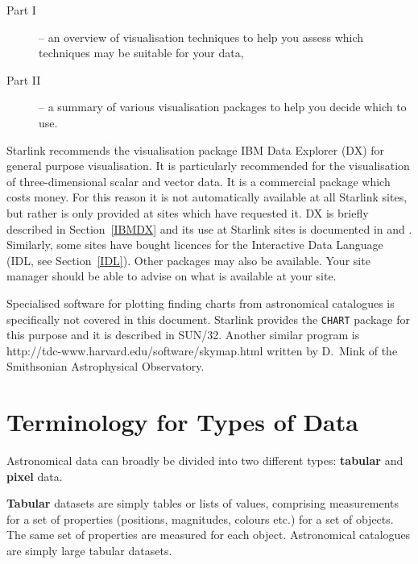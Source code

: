 \begin{description}

  \item[{\rm Part I}] -- an overview of visualisation techniques to
    help you assess which techniques may be suitable for your data,

  \item[{\rm Part II}] -- a summary of various visualisation packages
   to help you decide which to use.

\end{description}

Starlink recommends the visualisation package IBM Data Explorer (DX) for
general purpose visualisation. It is particularly recommended for the
visualisation of three-dimensional scalar and vector data. It is a
commercial package which costs money. For this reason it is not
automatically available at all Starlink sites, but rather is only
provided at sites which have requested it. DX is briefly described in
Section~\ref{IBMDX} and its use at Starlink sites is documented in
\cite{SUN203} and \cite{SC2}.
Similarly, some sites have bought licences for the Interactive Data
Language (IDL, see Section~\ref{IDL}). Other packages may also be
available. Your site manager should be able to advise on what is
available at your site. 

Specialised software for plotting finding charts from astronomical
catalogues is specifically not covered in this document. Starlink
provides the {\tt CHART} package for this purpose and it is described
in SUN/32\cite{CHART}. Another similar program is 
{http://tdc-www.harvard.edu/software/skymap.html}\cite{SKYMAP}
written by D.~Mink of the Smithsonian Astrophysical Observatory.


\section{Terminology for Types of Data  }

Astronomical data can broadly be divided into two different types:
{\bf tabular} and {\bf pixel} data.

{\bf Tabular} datasets are simply tables or lists of values, comprising
measurements for a set of properties (positions, magnitudes, colours
etc.) for a set of objects. The same set of properties are measured for
each object. Astronomical catalogues are simply large tabular datasets.

